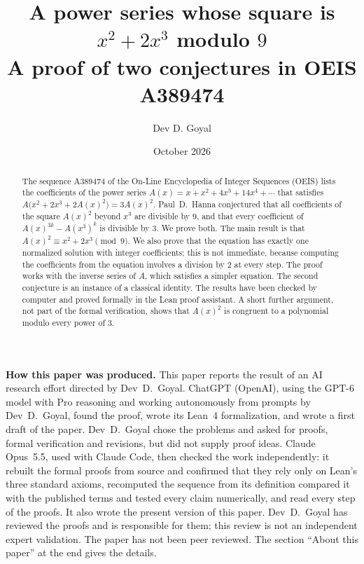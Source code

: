 \documentclass[11pt,a4paper]{article}
\title{A power series whose square is $x^2+2x^3$ modulo $9$\\[6pt]\large A proof of two conjectures in OEIS A389474}
\author{Dev D. Goyal}
\date{October 2026}
\theoremstyle{definition}
\theoremstyle{remark}
\begin{document}
\maketitle
\begin{abstract}
The sequence A389474 of the On-Line Encyclopedia of Integer Sequences (OEIS) lists the coefficients of the power series
$A(x)=x+x^2+4x^3+14x^4+\cdots$ that satisfies $A\bigl(x^2+2x^3+2A(x)^2\bigr)=3A(x)^2$. Paul~D.~Hanna conjectured that
all coefficients of the square $A(x)^2$ beyond $x^3$ are divisible by $9$, and that every coefficient of
$A(x)^{3k}-A(x^3)^k$ is divisible by $3$. We prove both. The main result is that $A(x)^2\equiv x^2+2x^3\pmod 9$. We also prove that the
equation has exactly one normalized solution with integer coefficients; this is not immediate, because computing the
coefficients from the equation involves a division by $2$ at every step. The proof works with the inverse series of $A$, which satisfies a simpler equation. The second
conjecture is an instance of a classical identity. The results have been checked by computer and proved formally in
the Lean proof assistant. A short further argument, not part of the formal verification, shows that $A(x)^2$ is
congruent to a polynomial modulo every power of $3$.
\end{abstract}
\begin{center}\begin{minipage}{0.88\linewidth}\small
\textbf{How this paper was produced.} This paper reports the result of an AI research effort directed by
Dev~D.~Goyal. ChatGPT (OpenAI), using the GPT-6 model with Pro reasoning and working autonomously from prompts by
Dev~D.~Goyal, found the proof, wrote its Lean~4 formalization, and wrote a first draft of the paper.
Dev~D.~Goyal chose the problems and asked for proofs, formal verification and revisions, but did not supply proof
ideas. Claude Opus~5.5, used with Claude Code, then checked the work independently: it rebuilt the formal proofs from
source and confirmed that they rely only on Lean's three standard axioms, recomputed the sequence from its definition
compared it with the published terms and tested every claim numerically, and read every step of the proofs. It also wrote the present
version of this paper.
Dev~D.~Goyal has reviewed the proofs and is responsible for them; this review is not an independent expert validation.
The paper has not been peer reviewed.
The section ``About this paper'' at the end gives the details.
\end{minipage}\end{center}
\end{document}
